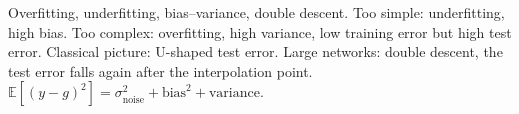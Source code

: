 \begin{qabox}[Klambauer]{\cexam Overfitting, underfitting, bias--variance, double descent.}
\ans Too simple: underfitting, high bias. Too complex: overfitting, high variance, low training
error but high test error. Classical picture: U-shaped test error. Large networks: double descent,
the test error falls again after the interpolation point.
\formula $\mathbb{E}[(y-g)^2]=\sigma^2_{\text{noise}}+\text{bias}^2+\text{variance}$.
\end{qabox}
